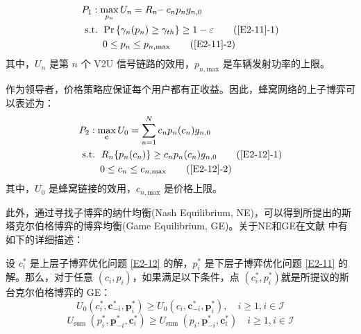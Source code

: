 \begin{align} \label{E2-11}
&P_1: \max\limits_{p_{n}} U_{n}=R_{n}\!\!-c_{n} p_n g_{n,0}                                                          \\
&\text { s.t. }
\quad \!\!\!\!\! \textrm{Pr}\left\{\gamma_{n}(p_n) \geq \gamma_{th}\right\}\geq1-\varepsilon  \tag{\ref{E2-11}{-1}}  \label{E2-11-1}\\
& \quad \quad \quad \!\!\!\!\! 0\leq p_n\leq p_{n,\textrm{max}}                               \tag{\ref{E2-11}{-2}}  \label{E2-11-2}
\end{align}
其中，$U_{n}$ 是第 $n$ 个 V2U 信号链路的效用，$p_{n,\textrm{max}}$ 是车辆发射功率的上限。

作为领导者，价格策略应保证每个用户都有正收益。因此，蜂窝网络的上子博弈可以表述为：
\begin{align} \label{E2-12}
&P_2: \max\limits_{\mathbf{c}} U_0=\sum\limits_{n=1}^N c_{n} p_n(c_{n}) g_{n,0}                    \\
& \text { s.t. }
\quad \!\!\!\!\! R_{n}\{p_n(c_{n})\} \geq c_{n} p_n(c_{n}) g_{n,0}          \tag{\ref{E2-12}{-1}}  \label{E2-12-1}\\  %
& \quad \quad \quad \!\!\!\!\! 0\leq c_n\leq c_{n,\textrm{max}}             \tag{\ref{E2-12}{-2}}  \label{E2-12-2}  %
\end{align}
其中，$U_{0}$ 是蜂窝链接的效用，$c_{n,\textrm{max}}$ 是价格上限。

此外，通过寻找子博弈的纳什均衡(Nash Equilibrium, NE)，可以得到所提出的斯塔克尔伯格博弈的博弈均衡(Game Equilibrium, GE)。关于NE和GE在文献 \cite{RAI}中有如下的详细描述：

设 $c_i^*$ 是上层子博弈优化问题 \eqref{E2-12} 的解，$p_i^*$ 是下层子博弈优化问题 \eqref{E2-11} 的解。那么，对于任意 $(c_i,p_i)$，如果满足以下条件，点 $(c_i^*,p_i^*)$就是所提议的斯台克尔伯格博弈的 GE：
\begin{equation} \label{E2-13}
U_0\left(c_i^*, \mathbf{c}_{-i}^*, \mathbf{p}_i^*\right) \geq U_0\left(c_i, \mathbf{c}_{-i}^*, \mathbf{p}_i^*\right), \quad i \geq 1, i \in \mathcal{I}
\end{equation}
\begin{equation} \label{E2-14}
U_{\text {sum }}\left(p_i^*, \mathbf{p}_{-i}^*, \mathbf{c}_i^*\right) \geq U_{\text {sum }}\left(p_i, \mathbf{p}_{-i}^*, \mathbf{c}_i^*\right) \quad i \geq 1, i \in \mathcal{I}
\end{equation}

